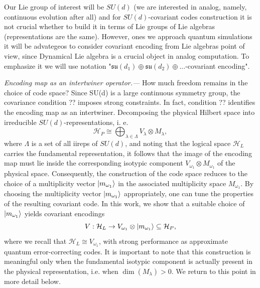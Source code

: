 \documentclass[twocolumn,superscriptaddress,aps,showpacs,amsmath,amstex,amssymb,citeautoscript,floatfix,pra,preprintnumbers]{revtex4-2}
\newcounter{alg}
\theoremstyle{plain}
\theoremstyle{plain}
\theoremstyle{plain}
\theoremstyle{plain}
\theoremstyle{plain}
\theoremstyle{plain}
\begin{document}
Our Lie group of interest will be $SU(d)$ (we are interested in analog, namely, continuous evolution after all) and for $SU(d)$-covariant codes construction it is not crucial whether to build it in terms of Lie groups of Lie algebras (representations are the same). However, ones we approach quantum simulations it will be advategeos to consider covariant encoding from Lie algebras point of view, since Dynamical Lie algebra is a crucial object in analog computation. To emphasize it we will use notation "$\mathfrak{su}(d_1)\oplus\mathfrak{su}(d_2)\oplus...$-covariant encoding".

\textit{Encoding map as an intertwiner operator.---} 
How much freedom remains in the choice of code space? Since SU(d) is a large continuous symmetry group, the covariance condition ?? imposes strong constraints. In fact, condition ?? identifies the encoding map as an intertwiner. Decomposing the physical Hilbert space into irreducible $SU(d)$-representations, i. e. 
\[
    \mathcal{H}_P\cong \bigoplus_{\lambda\in \Lambda}V_{\lambda}\otimes M_{\lambda},
\]
where $\Lambda$ is a set of all iireps of $SU(d)$,
and noting that the logical space $\mathcal{H}_L$ carries the fundamental representation, it follows that the image of the encoding map must lie inside the corresponding isotypic component $V_{\omega_1}\otimes M_{\omega_1}$ of the physical space. Consequently, the construction of the code space reduces to the choice of a multiplicity vector $\ket{m_{\omega_1}}$ in the associated multiplicity space $M_{\omega_1}$. By choosing the multiplicity vector $\ket{m_{\omega_1}}$ appropriately, one can tune the properties of the resulting covariant code. In this work, we show that a suitable choice of $\ket{m_{\omega_1}}$ yields covariant encodings
\[
    V: \mathcal{H}_L\rightarrow V_{\omega_1}\otimes \ket{m_{\omega_1}} \subseteq \mathcal{H}_P,
\]
where we recall that $\mathcal{H}_L\cong V_{\omega_1}$, with strong performance as approximate quantum error-correcting codes. It is important to note that this construction is meaningful only when the fundamental isotypic component is actually present in the physical representation, i.e. when $\operatorname{dim}(M_{\lambda})>0$. We return to this point in more detail below.
\end{document}
